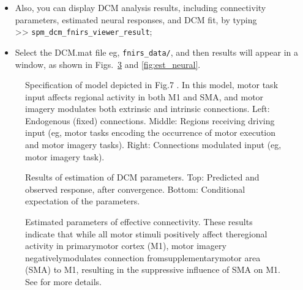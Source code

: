 \begin{enumerate}
\begin{itemize}
\item Also, you can display DCM analysis results, including connectivity parameters, estimated neural responses, and DCM fit, by typing \\ 
>> \texttt{spm\_dcm\_fnirs\_viewer\_result};
\item Select the DCM.mat file eg, \texttt{fnirs\_data/}, and then results will appear in a window, as shown in Figs.~\ref{fig:est_conn} and \ref{fig:est_neural}. 
\end{itemize}
\end{enumerate}

\newpage
\begin{figure}
\begin{center}
\caption{Specification of model depicted in Fig.7 \cite{tak2015dynamic}. In this model, motor task input affects regional activity in both M1 and SMA, and motor imagery modulates both extrinsic and intrinsic connections. Left: Endogenous (fixed) connections. Middle: Regions receiving driving input (eg, motor tasks encoding the occurrence of motor execution and motor imagery tasks). Right: Connections modulated input (eg, motor imagery task).\label{fig:gui_con}}
\end{center}
\end{figure}


\newpage
\begin{figure}
\begin{center}
\caption{Results of estimation of DCM parameters. Top: Predicted and observed response, after convergence. Bottom: Conditional expectation of the parameters.\label{fig:fit}}
\end{center}
\end{figure}


\newpage
\begin{figure}
\begin{center}
\caption{Estimated parameters of effective connectivity. These results indicate that while all motor stimuli positively affect theregional activity in primarymotor cortex (M1), motor imagery negativelymodulates connection fromsupplementarymotor area (SMA) to M1, resulting in the suppressive influence of SMA on M1. See \cite{tak2015dynamic} for more details. \label{fig:est_conn}}
\end{center}
\end{figure}

